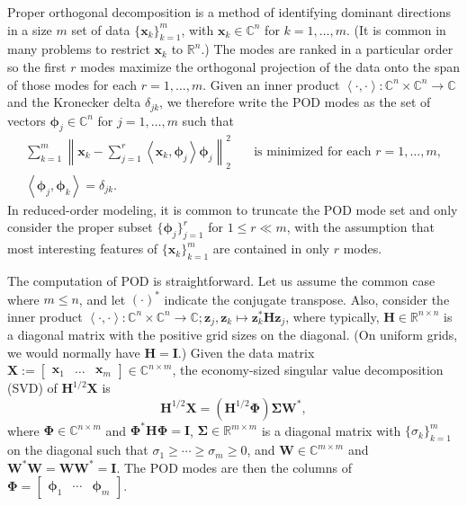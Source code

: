 \documentclass[11pt]{article}
\newcommand*{\Complex}{\mathbb{C}}
\newcommand*{\Reals}{\mathbb{R}}
\newcommand*{\half}{^{1/2}}
\newcommand*{\ip}[2]{\left<#1, #2\right>}
\renewcommand*{\H}{\mathbf{H}}
\newcommand*{\I}{\mathbf{I}}
\newcommand*{\X}{\mathbf{X}}
\newcommand*{\W}{\mathbf{W}}
\newcommand*{\PHI}{\mathbf{\Phi}}
\newcommand*{\SIGMA}{\mathbf{\Sigma}}
\newcommand*{\x}{\mathbf{x}}
\newcommand*{\z}{\mathbf{z}}
\newcommand*{\phiv}{\bm{\phi}}
\begin{document}
Proper orthogonal decomposition \citep{SirovichQAM87, HolmesTCSDSS} is a method of identifying dominant directions in a size $m$ set of data $\{\x_k\}_{k=1}^m$, with $\x_k \in \Complex^n$ for $k = 1, \ldots, m$.
(It is common in many problems to restrict $\x_k$ to $\Reals^n$.)
The modes are ranked in a particular order so the first $r$ modes maximize the orthogonal projection of the data onto the span of those modes for each $r = 1, \ldots, m$.
Given an inner product $\ip{\cdot}{\cdot} : \Complex^n \times \Complex^n \to \Complex$ and the Kronecker delta $\delta_{jk}$, we therefore write the POD modes as the set of vectors $\phiv_j \in \Complex^n$ for $j = 1, \ldots, m$ such that
\begin{subequations}
    \begin{align}
        \sum_{k=1}^m \left\|\x_k - \sum_{j=1}^r \ip{\x_k}{\phiv_j} \phiv_j \right\|_2^2 \quad & \text{is minimized for each } r = 1, \ldots, m, \\
        \ip{\phiv_j}{\phiv_k} = \delta_{jk}.
    \end{align}
\end{subequations}
In reduced-order modeling, it is common to truncate the POD mode set and only consider the proper subset $\{\phiv_j\}_{j=1}^r$ for $1 \le r \ll m$, with the assumption that most interesting features of $\{\x_k\}_{k=1}^m$ are contained in only $r$ modes.

The computation of POD is straightforward.
Let us assume the common case where $m \le n$, and let $(\cdot)^*$ indicate the conjugate transpose.
Also, consider the inner product $\ip{\cdot}{\cdot} : \Complex^n \times \Complex^n \to \Complex; \z_j, \z_k \mapsto \z_k^* \H \z_j$, where typically, $\H \in \Reals^{n \times n}$ is a diagonal matrix with the positive grid sizes on the diagonal.
(On uniform grids, we would normally have $\H = \I$.)
Given the data matrix $\X := \begin{bmatrix} \x_1 & \ldots & \x_m \end{bmatrix} \in \Complex^{n \times m}$, the economy-sized singular value decomposition (SVD) of $\H\half \X$ is
\begin{equation}
    \label{eq:svd}
    \H\half \X = (\H\half\PHI) \SIGMA \W^*,
\end{equation}
where $\PHI \in \Complex^{n \times m}$ and $\PHI^* \H \PHI = \I$, $\SIGMA \in \Reals^{m \times m}$ is a diagonal matrix with $\{\sigma_k\}_{k=1}^m$ on the diagonal such that $\sigma_1 \ge \cdots \ge \sigma_m \ge 0$, and $\W \in \Complex^{m \times m}$ and $\W^* \W = \W \W^* = \I$.
The POD modes are then the columns of $\PHI = \begin{bmatrix} \phiv_1 & \cdots & \phiv_m \end{bmatrix}$.
\end{document}

